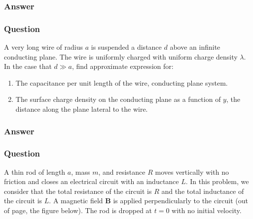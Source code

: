 \subsubsection{Answer}


\subsubsection{Question}
A very long wire of radius $a$ is suspended a distance $d$ above an infinite conducting plane. The wire is uniformly charged with uniform charge density $\lambda$. In the case that $d\gg a$, find approximate expression for:
\begin{enumerate}
	\item The capacitance per unit length of the wire, conducting plane system.
	\item The surface charge density on the conducting plane as a function of $y$, the distance along the plane lateral to the wire.
\end{enumerate}

\subsubsection{Answer}



\subsubsection{Question}
A thin rod of length $a$, mass $m$, and resistance $R$ moves vertically with no friction and closes an electrical circuit with an inductance $L$. In this problem, we consider that the total resistance of the circuit is $R$ and the total inductance of the circuit is $L$. A magnetic field $\boldsymbol{B}$ is applied perpendicularly to the circuit (out of page, the figure below). The rod is dropped at $t = 0$ with no initial velocity.

